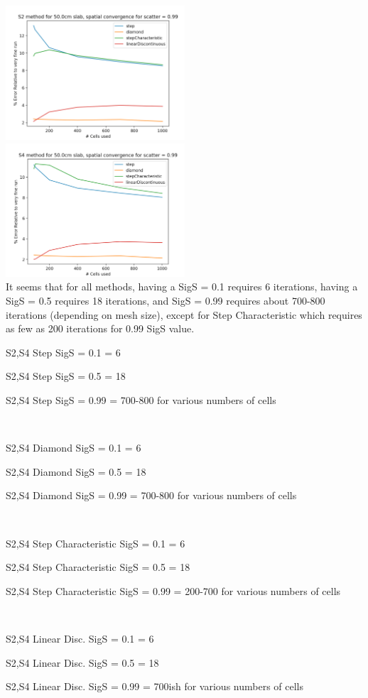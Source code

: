 \documentclass[a4paper]{article}
\begin{document}
\includegraphics[width=0.5\textwidth]{f6}
\includegraphics[width=0.5\textwidth]{f5}\\

It seems that for all methods, having a SigS = 0.1 requires 6 iterations, having a SigS = 0.5 requires 18 iterations, and SigS = 0.99 requires about 700-800 iterations (depending on mesh size), except for Step Characteristic which requires as few as 200 iterations for 0.99 SigS value.\par
S2,S4 Step SigS = 0.1  = 6\par
S2,S4 Step SigS = 0.5  = 18\par
S2,S4 Step SigS = 0.99 = 700-800 for various numbers of cells\par~\par

S2,S4 Diamond SigS = 0.1  = 6\par
S2,S4 Diamond SigS = 0.5  = 18\par
S2,S4 Diamond SigS = 0.99 = 700-800 for various numbers of cells\par~\par

S2,S4 Step Characteristic SigS = 0.1  = 6\par
S2,S4 Step Characteristic SigS = 0.5  = 18\par
S2,S4 Step Characteristic SigS = 0.99 = 200-700 for various numbers of cells\par~\par

S2,S4 Linear Disc. SigS = 0.1  = 6\par
S2,S4 Linear Disc. SigS = 0.5  = 18\par
S2,S4 Linear Disc. SigS = 0.99 = 700ish for various numbers of cells\par~\par
\end{document}
